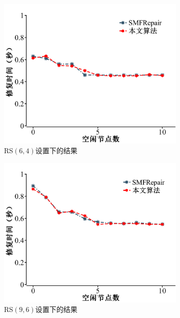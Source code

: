\begin{figure}[htbp]
	\centering
	\begin{subfigure}[t]{0.4\textwidth}
		\centering
		\includegraphics[width=1\linewidth]{figures/3-15.pdf}
		\caption{RS$(6,4)$设置下的结果}
		\label{fig:3-15}
	\end{subfigure}
	\begin{subfigure}[t]{0.4\textwidth}
		\centering
		\includegraphics[width=1\linewidth]{figures/3-16.pdf}
		\caption{RS$(9,6)$设置下的结果}
		\label{fig:3-16}
	\end{subfigure}
	\begin{subfigure}[t]{0.4\textwidth}

\end{subfigure}
\end{figure}
